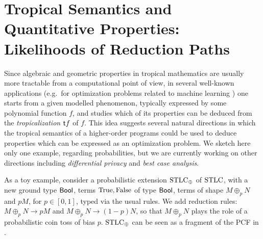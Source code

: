 \documentclass[submission,%
]{eptcs}
\begin{document}
\section{Tropical Semantics and Quantitative Properties: Likelihoods of Reduction Paths}

Since algebraic and geometric properties in tropical mathematics are usually more tractable from a computational point of view, in several well-known applications (e.g.~for optimization problems related to machine learning \cite{Pachter2004, Zhang2018, Maragos2021}) one starts from a given modelled phenomenon, typically expressed by some polynomial function $f$, and studies which of its properties can be deduced from the \emph{tropicalization} $\mathsf{t} f$ of $f$.
This idea suggests several natural directions in which the tropical semantics of a higher-order programs could be used to deduce properties which can be expressed as an optimization problem.%
We sketch here only one example, regarding probabilities, but we are currently working on other directions including \emph{differential privacy} and \emph{best case analysis}.

As a toy example, consider a probabilistic extension $\mathrm{STLC}_\oplus$ of $\mathrm{STLC}$, with a new ground type $\mathsf{Bool}$, terms $\mathrm{True},\mathrm{False}$ of type $\mathsf{Bool}$, terms of shape $M\oplus_p N$ and $pM$, for $p\in[0,1]$, typed via the usual rules.
We add reduction rules:
$M\oplus_p N \to pM$ and $M\oplus_p N \to (1-p)N$,
so that $M\oplus_p N$ plays the role of a probabilistic coin toss of bias $p$.
$\mathrm{STLC}_\oplus$ can be seen as a fragment of the PCF in \cite{Manzo2013}.
\end{document}
